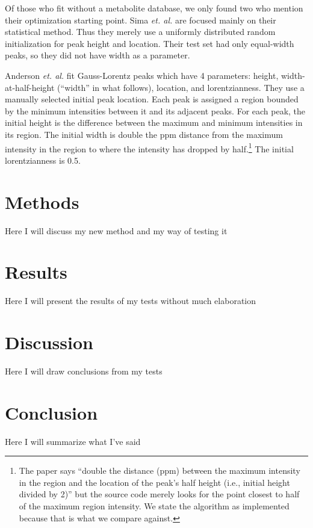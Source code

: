 \documentclass[10pt,letterpaper]{article}
\begin{document}
Of those who fit without a metabolite database, we only found two who mention their optimization starting point.
Sima \textit{et. al.}\cite{Sima2006} are focused mainly on their statistical method. Thus they merely use a 
uniformly distributed random initialization for peak height and location. Their test set had only equal-width
peaks, so they did not have width as a parameter.

Anderson \textit{et. al.}\cite{Anderson2012} fit Gauss-Lorentz peaks which have 4 parameters: height, 
width-at-half-height (``width'' in what follows), location, and lorentzianness. They use a manually selected 
initial peak location. Each peak is assigned a region bounded by the minimum intensities between it and its 
adjacent peaks. For each peak, the initial height is the difference between the maximum and minimum intensities 
in its region. The initial width is double the ppm distance from the maximum intensity in the region to where 
the intensity has dropped by half.\footnote{
The paper says ``double the distance (ppm) between the maximum intensity in the region and the
location of the peak’s half height (i.e., initial height divided by 2)'' but the source code merely looks for
the point closest to half of the maximum region intensity. We state the algorithm as implemented because that
is what we compare against.} The initial lorentzianness is 0.5.

\section{Methods}
Here I will discuss my new method and my way of testing it
\section{Results}
Here I will present the results of my tests without much elaboration
\section{Discussion}
Here I will draw conclusions from my tests
\section{Conclusion}
Here I will summarize what I've said



\end{document}
